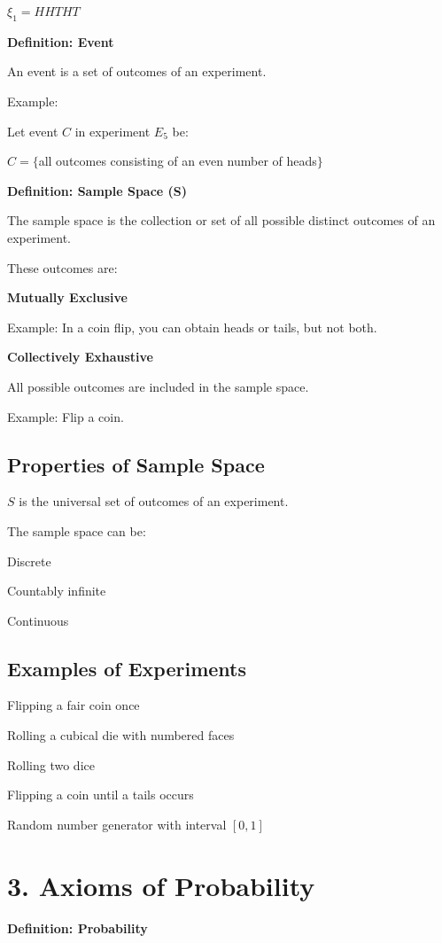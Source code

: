 \documentclass[12pt]{article}
\begin{document}
$\xi_1 = HHTHT$

\textbf{Definition: Event}

An event is a set of outcomes of an experiment.

Example:

Let event $C$ in experiment $E_5$ be:

$C = \{$all outcomes consisting of an even number of heads$\}$

\textbf{Definition: Sample Space (S)}

The sample space is the collection or set of all possible distinct outcomes of an experiment.

These outcomes are:

\textbf{Mutually Exclusive}

Example: In a coin flip, you can obtain heads or tails, but not both.

\textbf{Collectively Exhaustive}

All possible outcomes are included in the sample space.

Example: Flip a coin.

\subsection*{Properties of Sample Space}

$S$ is the universal set of outcomes of an experiment.

The sample space can be:

Discrete

Countably infinite

Continuous

\subsection*{Examples of Experiments}

Flipping a fair coin once

Rolling a cubical die with numbered faces

Rolling two dice

Flipping a coin until a tails occurs

Random number generator with interval $[0,1]$

\section*{3. Axioms of Probability}

\textbf{Definition: Probability}
\end{document}
